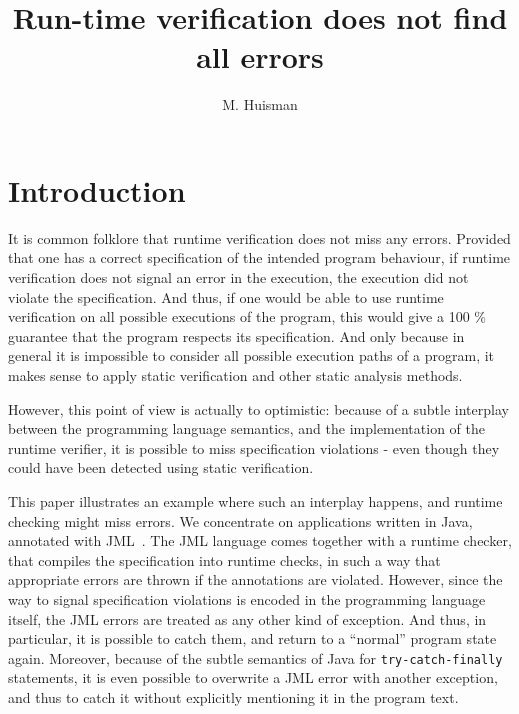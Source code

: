 \documentclass[]{llncs}
\title{Run-time verification does not find all errors}
\author{M. Huisman}
\institute{INRIA Sophia Antipolis-Mediterran\'ee, France}
\begin{document}
\maketitle

\begin{abstract}

\end{abstract}

\section{Introduction}

It is common folklore that runtime verification does not miss any
errors. Provided that one has a correct specification of the intended
program behaviour, if runtime verification does not signal an error in
the execution, the execution did not violate the specification. And
thus, if one would be able to use runtime verification on all possible
executions of  the program, this would give a 100 \% guarantee that
the program respects its specification. And only because in general it is
impossible to consider all possible execution paths of a program, it
makes sense to apply static verification and other static analysis
methods.

However, this point of view is actually to optimistic: because of a
subtle interplay between the programming language semantics, and the
implementation of the runtime verifier, it is possible to miss
specification violations - even though they could have been detected
using static verification.

This paper illustrates an example where such an interplay happens, and
runtime checking might miss errors. We concentrate on applications
written in Java, annotated with JML~\cite{LeavensBR99}. The JML
language comes together with a runtime checker, that compiles the
specification into runtime checks, in such a way that appropriate
errors are thrown if the annotations are violated. However, since
the way to signal specification violations is encoded in the
programming language itself, the JML errors are treated as any
other kind of exception. And thus, in particular, it is possible to
catch them, and return to a ``normal'' program state again. Moreover,
because of the subtle semantics of Java for \texttt{try-catch-finally}
statements, it is even possible to overwrite a JML error with another
exception, and thus to catch it without explicitly
mentioning it in the program text.
\end{document}

